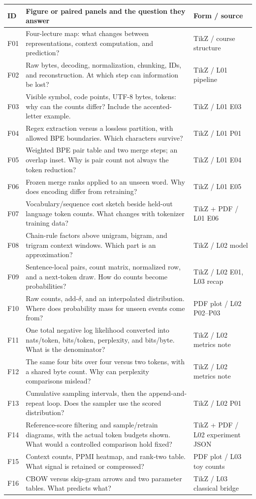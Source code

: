 \documentclass[11pt,a4paper]{article}
\begin{document}
\begingroup
\small
\renewcommand{\arraystretch}{1.23}
\begin{tabularx}{\textwidth}{@{}p{8mm} Y >{\raggedright\arraybackslash}p{32mm}@{}}
\toprule
ID & Figure or paired panels and the question they answer & Form / source\\
\midrule
F01 & Four-lecture map: what changes between representations, context computation, and prediction? & TikZ / course structure\\
F02 & Raw bytes, decoding, normalization, chunking, IDs, and reconstruction. At which step can information be lost? & TikZ / L01 pipeline\\
F03 & Visible symbol, code points, UTF-8 bytes, tokens: why can the counts differ? Include the accented-letter example. & TikZ / L01 E03\\
F04 & Regex extraction versus a lossless partition, with allowed BPE boundaries. Which characters survive? & TikZ / L01 P01\\
F05 & Weighted BPE pair table and two merge steps; an overlap inset. Why is pair count not always the token reduction? & TikZ / L01 E04\\
F06 & Frozen merge ranks applied to an unseen word. Why does encoding differ from retraining? & TikZ / L01 E05\\
F07 & Vocabulary/sequence cost sketch beside held-out language token counts. What changes with tokenizer training data? & TikZ + PDF / L01 E06\\
F08 & Chain-rule factors above unigram, bigram, and trigram context windows. Which part is an approximation? & TikZ / L02 model\\
F09 & Sentence-local pairs, count matrix, normalized row, and a next-token draw. How do counts become probabilities? & TikZ / L02 E01, L03 recap\\
F10 & Raw counts, add-$\delta$, and an interpolated distribution. Where does probability mass for unseen events come from? & PDF plot / L02 P02--P03\\
F11 & One total negative log likelihood converted into nats/token, bits/token, perplexity, and bits/byte. What is the denominator? & TikZ / L02 metrics note\\
F12 & The same four bits over four versus two tokens, with a shared byte count. Why can perplexity comparisons mislead? & TikZ / L02 metrics note\\
F13 & Cumulative sampling intervals, then the append-and-repeat loop. Does the sampler use the scored distribution? & TikZ / L02 P01\\
F14 & Reference-score filtering and sample/retrain diagrams, with the actual token budgets shown. What would a controlled comparison hold fixed? & TikZ + PDF / L02 experiment JSON\\
F15 & Context counts, PPMI heatmap, and rank-two table. What signal is retained or compressed? & PDF plot / L03 toy counts\\
F16 & CBOW versus skip-gram arrows and two parameter tables. What predicts what? & TikZ / L03 classical bridge\\
\bottomrule
\end{tabularx}
\endgroup
\end{document}
